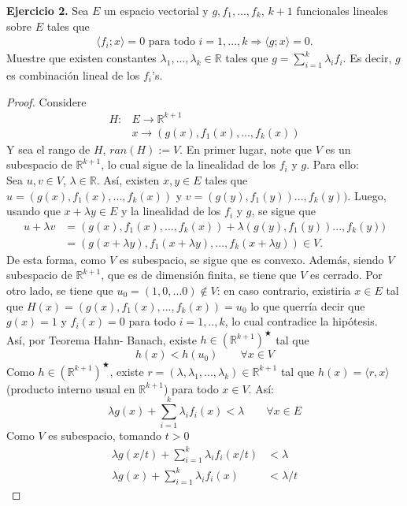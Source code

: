 \textbf{Ejercicio 2.} Sea $E$ un espacio vectorial y $g,f_1,...,f_k$, $k+1$ funcionales lineales sobre $E$ tales que
\begin{align*}
    \langle f_i;x\rangle=0 \text{ para todo } i=1,...,k \Longrightarrow \langle g;x\rangle=0.
\end{align*}
Muestre que existen constantes $\lambda_1,...,\lambda_k\in \mathbb{R}$ tales que $\displaystyle g=\sum_{i=1}^k \lambda_if_i$. Es decir, $g$ es combinación lineal de los $f_i$'s.
\begin{proof}
Considere
\begin{align*}
    H:&E\longrightarrow\mathbb{R}^{k+1} \\&x \longrightarrow(g(x),f_1(x),...,f_k(x))
\end{align*}
Y sea el rango de $H$, $ran(H):=V$. En primer lugar, note que $V$ es un subespacio de $\mathbb{R}^{k+1}$, lo cual sigue de la linealidad de los $f_i$ y $g$. Para ello: \\
\checkmark Sea $u,v \in V$, $\lambda \in \mathbb{R}$. Así, existen $x,y \in E$ tales que $u=(g(x),f_1(x),...,f_k(x))$ y $v=(g(y),f_1(y))...,f_k(y))$. Luego, usando que $x+\lambda y \in E$ y la linealidad de los $f_i$ y $g$, se sigue que 
\begin{align*}
 u+\lambda v&=(g(x),f_1(x),...,f_k(x))+\lambda (g(y),f_1(y))...,f_k(y)) \\ &=(g(x+\lambda y),f_1(x+\lambda y),...,f_k(x+ \lambda y)) \in V.
\end{align*}
De esta forma, como $V$ es subespacio, se sigue que es convexo. Además, siendo $V$ subespacio de $\mathbb{R}^{k+1}$, que es de dimensión finita, se tiene que $V$ es cerrado. Por otro lado, se tiene que $u_0=(1,0,...0)\notin V$: en caso contrario, existiria $x \in E$ tal que $H(x)=(g(x),f_1(x),...,f_k(x))=u_0$ lo que querría decir que $g(x)=1$ y $f_i(x)=0$ para todo $i=1,..,k$, lo cual contradice la hipótesis. 
\\
Así, por Teorema Hahn- Banach, existe $h \in (\mathbb{R}^{k+1})^\bigstar$ tal que 
\[
h(x)<h(u_0) \qquad \forall x \in V
\]
Como $h\in (\mathbb{R}^{k+1})^\bigstar$, existe $r=(\lambda,\lambda_1,...,\lambda_k)\in \mathbb{R}^{k+1}$ tal que $h(x)=\langle r,x\rangle$ (producto interno usual en $\mathbb{R}^{k+1}$) para todo $x\in V$. Así:
\[
\lambda g(x)+\sum_{i=1}^{k}\lambda_if_i(x)<\lambda \qquad\forall x \in E
\]
Como $V$ es subespacio, tomando $t>0$
\begin{align*}
    \lambda g(x/t)+\sum_{i=1}^{k}\lambda_if_i(x/t)&<\lambda \\
    \lambda g(x)+\sum_{i=1}^{k}\lambda_if_i(x)&<\lambda/t

\end{align*}
\end{proof}
